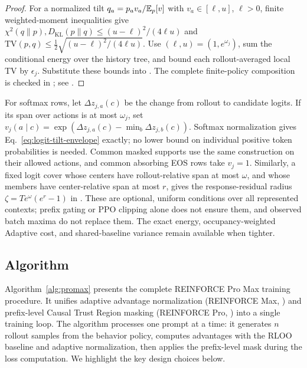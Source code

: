 \begin{proof}
For a normalized tilt $q_a=p_av_a/\mathbb{E}_p[v]$ with $v_a\in[\ell,u]$,
$\ell>0$, finite weighted-moment inequalities give
$\chi^2(q\|p),D_{\mathrm{KL}}(p\|q)\le(u-\ell)^2/(4\ell u)$
and $\mathrm{TV}(p,q)\le\frac12\sqrt{(u-\ell)^2/(4\ell u)}$.
Use $(\ell,u)=(1,e^{\omega_j})$, sum the conditional energy over the
history tree, and bound each rollout-averaged local TV by $\epsilon_j$.
Substitute these bounds into .
The complete finite-policy composition is checked in
; see .
\end{proof}

For softmax rows, let $\Delta z_{j,a}(c)$ be the change from rollout to
candidate logits. If its span over actions is at most $\omega_j$, set
$v_j(a\mid c)=\exp(\Delta z_{j,a}(c)-\min_b\Delta z_{j,b}(c))$.
Softmax normalization gives Eq.~\eqref{eq:logit-tilt-envelope} exactly;
no lower bound on individual positive token probabilities is needed.
Common masked supports use the same construction on their allowed actions,
and common absorbing EOS rows take $v_j=1$.
Similarly, a fixed logit cover whose centers have rollout-relative span at
most $\omega$, and whose members have center-relative span at most $r$,
gives the response-residual radius
$\zeta=Te^\omega(e^r-1)$ in .
These are optional, uniform conditions over all represented contexts;
prefix gating or PPO clipping alone does not ensure them, and observed
batch maxima do not replace them. The exact energy, occupancy-weighted
Adaptive cost, and shared-baseline variance remain available when tighter.

\subsection{Algorithm}

Algorithm~\ref{alg:promax} presents the complete REINFORCE Pro Max training procedure. It unifies adaptive advantage normalization
(REINFORCE Max, ) and prefix-level Causal Trust Region masking (REINFORCE Pro, ) into a single
training loop. The algorithm processes one prompt at a time: it generates $n$ rollout samples from the behavior policy, computes
advantages with the RLOO baseline and adaptive normalization, then applies the prefix-level mask during the loss computation. We
highlight the key design choices below.

